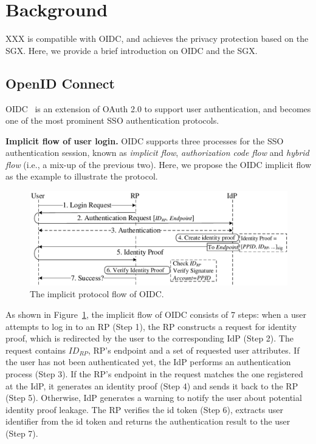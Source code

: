 \section{Background}
XXX is compatible with OIDC, and achieves the privacy protection based on the SGX.
Here, we provide a brief introduction on OIDC and the SGX.
\subsection{OpenID Connect}
OIDC~\cite{OpenIDConnect} is an extension of OAuth 2.0 to support user authentication,
 and becomes one of the most prominent SSO authentication protocols.

\noindent\textbf{Implicit flow of user login.}
OIDC supports three processes for the SSO authentication session, known as {\em implicit flow}, {\em authorization code flow} and {\em hybrid flow} (i.e., a mix-up of the previous two). Here, we propose the OIDC implicit flow as the example to illustrate the protocol. 

\begin{figure}[t]
  \centering
  \includegraphics[width=\linewidth]{fig/OIDC1.pdf}
  \caption{The implicit protocol flow of OIDC.}
  \label{fig:OpenID}
\end{figure}

As shown in Figure~\ref{fig:OpenID}, the implicit flow of OIDC consists of 7 steps: when a user attempts to log in to an RP (Step 1), the RP constructs a request for identity proof, which is redirected by the user to the corresponding IdP (Step 2). The request contains $ID_{RP}$, RP's endpoint and a set of requested user attributes. If the user has not been authenticated yet, the IdP performs an authentication process (Step 3). If the RP's endpoint in the request matches the one registered at the IdP, it generates an identity proof (Step 4) and sends it back to the RP (Step 5). Otherwise, IdP generates a warning to notify the user about potential identity proof leakage. The RP verifies the id token (Step 6), extracts user identifier from the id token and returns the authentication result to the user (Step 7).

